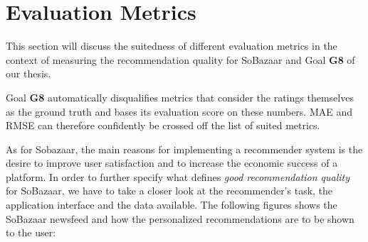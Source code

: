 \section{Evaluation Metrics}
\label{sec:eval-metrics}


This section will discuss the suitedness of different evaluation metrics in the context
of measuring the recommendation quality for SoBazaar and Goal \textbf{G8} of our thesis.

Goal \textbf{G8} automatically disqualifies metrics that consider the ratings themselves as the
ground truth and bases its evaluation score on these numbers. MAE and RMSE can therefore
confidently be crossed off the list of suited metrics.

As for Sobazaar, the main reasons for implementing a recommender system is the desire to improve user
satisfaction and to increase the economic success of a platform. In order to further specify what
defines \emph{good recommendation quality} for SoBazaar, we have to take a closer look at the
recommender's task, the application interface and the data available. The following figures
shows the SoBazaar newsfeed and how the personalized recommendations are to be shown to the user:

